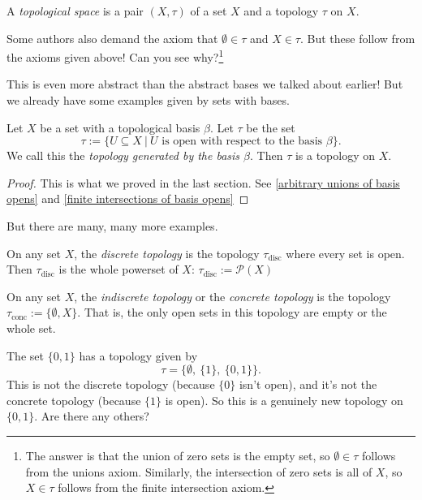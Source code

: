 \documentclass[noname]{notes}
\begin{document}
\begin{definition}
	A \emph{topological space} is a pair $(X,\tau)$ of a set $X$ and a topology $\tau$ on $X$. 
\end{definition} 

\begin{remark}
	Some authors also demand the axiom that $\emptyset \in \tau$ and $X \in \tau$. But these follow from the axioms given above! Can you see why?\footnote{The answer is that the union of zero sets is the empty set, so $\emptyset \in \tau$ follows from the unions axiom. Similarly, the intersection of zero sets is all of $X$, so $X \in \tau$ follows from the finite intersection axiom.}
\end{remark}

This is even more abstract than the abstract bases we talked about earlier! But we already have some examples given by sets with bases. 

\begin{theorem}
	Let $X$ be a set with a topological basis $\beta$. Let $\tau$ be the set 
	\[
		\tau := \Big\{ U \subseteq X\ \Big\vert\ U \text{ is open with respect to the basis } \beta \Big\}. 
	\]
	We call this the \emph{topology generated by the basis $\beta$}. Then $\tau$ is a topology on $X$. 
\end{theorem}

\begin{proof}
	This is what we proved in the last section. See \cref{arbitrary unions of basis opens} and \cref{finite intersections of basis opens}
\end{proof}

But there are many, many more examples. 

\begin{example}
	On any set $X$, the \emph{discrete topology} is the topology $\tau_\text{disc}$ where every set is open. Then $\tau_{\text{disc}}$ is the whole powerset of $X$:  $\tau_\text{disc} := \mathcal{P}(X)$
\end{example}

\begin{example}
	On any set $X$, the \emph{indiscrete topology} or the \emph{concrete topology} is the topology $\tau_\text{conc} := \{\emptyset, X\}$. That is, the only open sets in this topology are empty or the whole set. 
\end{example}	

\begin{example}
	The set $\{0,1\}$ has a topology given by 
	\[
		\tau = \Big\{\emptyset,\ \{1\},\ \{0,1\} \Big\}.
	\]
	This is not the discrete topology (because $\{0\}$ isn't open), and it's not the concrete topology (because $\{1\}$ is open). So this is a genuinely new topology on $\{0,1\}$. Are there any others? 
\end{example}
\end{document}
